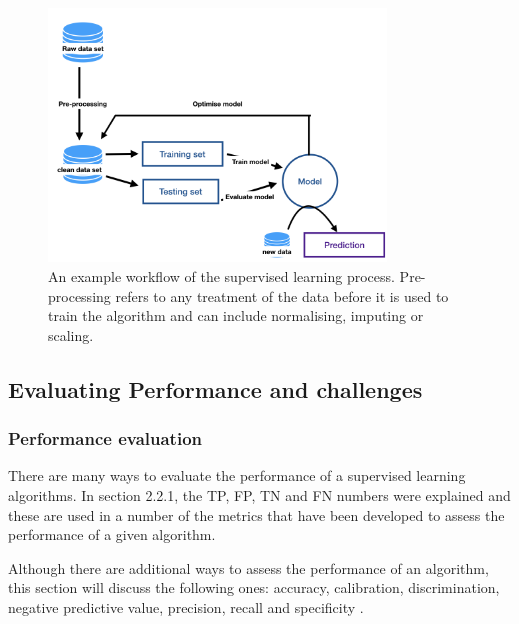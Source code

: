 \begin{figure}[H]
    \centering
    \includegraphics[width=0.8\textwidth]{ThesisTemplate/usingLatex/images/supervisedLearning.png}
    \caption{An example workflow of the supervised learning process. Pre-processing refers to any treatment of the data before it is used to train the algorithm and can include normalising, imputing or scaling.}
    \label{fig:supervisedLearning}
\end{figure}


\subsection{Evaluating Performance and challenges}

\subsubsection{Performance evaluation}
There are many ways to evaluate the performance of a supervised learning algorithms. In section 2.2.1, the TP, FP, TN and FN numbers were explained and these are used in a number of the metrics that have been developed to assess the performance of a given algorithm.

Although there are additional ways to assess the performance of an algorithm, this section will discuss the following ones: accuracy, calibration, discrimination, negative predictive value, precision, recall and specificity \citep{Callahan:2017bz}.

